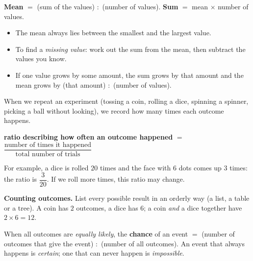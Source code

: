 \begin{knowbox}
\textbf{Mean} $=$ (sum of the values) $:$ (number of values). \qquad \textbf{Sum} $=$ mean $\times$ number of values.
\begin{itemize}[leftmargin=1.4em,itemsep=3pt]
\item The mean always lies between the smallest and the largest value.
\item To find a \emph{missing value}: work out the sum from the mean, then subtract the values you know.
\item If one value grows by some amount, the sum grows by that amount and the mean grows by (that amount) $:$ (number of values).
\end{itemize}
\end{knowbox}
\begin{knowbox}
When we repeat an experiment (tossing a coin, rolling a dice, spinning a spinner, picking a ball without looking), we record how many times each outcome happens.
\begin{center}
\textbf{ratio describing how often an outcome happened} $=$ $\dfrac{\text{number of times it happened}}{\text{total number of trials}}$
\end{center}
For example, a dice is rolled $20$ times and the face with $6$ dots comes up $3$ times: the ratio is $\dfrac{3}{20}$. If we roll more times, this ratio may change.\par\smallskip
\textbf{Counting outcomes.} List every possible result in an orderly way (a list, a table or a tree). A coin has $2$ outcomes, a dice has $6$; a coin \emph{and} a dice together have $2\times6=12$.\par
When all outcomes are \emph{equally likely}, the \textbf{chance} of an event $=$ (number of outcomes that give the event) $:$ (number of all outcomes). An event that always happens is \emph{certain}; one that can never happen is \emph{impossible}.
\end{knowbox}
\gap

